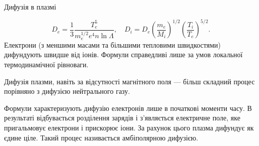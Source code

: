 \documentclass[]{beamer}
\begin{document}
\begin{frame}{Дифузія в плазмі}{}
	\begin{block}{}\justifying
		\begin{equation*}
			D_e = \frac13 \frac{T_e^5}{m_e^{1/2}e^4 n \ln\Lambda}, \quad D_i = D_e \left( \frac{m_e}{M_i} \right)^{1/2} \left(
			\frac{T_i}{T_e}\right)^{5/2}  .
		\end{equation*}
		Електрони (з меншими масами та більшими тепловими швидкостями) дифундують швидше від іонів. Формули справедливі лише за умов локальної
		термодинамічної рівноваги.
	\end{block}
	\begin{block}{}\justifying
		Дифузія плазми, навіть за відсутності магнітного поля --- більш складний процес порівняно з дифузією нейтрального газу.


		\bigskip

		Формули характеризують дифузію електронів лише в початкові моменти часу.  В результаті відбувається розділення зарядів і з’являється електричне
		поле, яке пригальмовує електрони і прискорює іони. За рахунок цього плазма дифундує як єдине ціле. Такий процес називається \alert{амбіполярною
			дифузією}.
	\end{block}
\end{frame}
\end{document}
